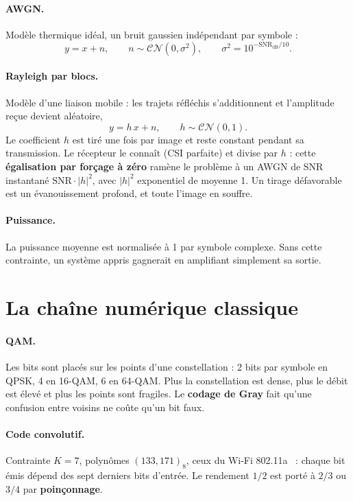 \paragraph{AWGN.} Modèle thermique idéal, un bruit gaussien indépendant par symbole :
\begin{equation}
  y = x + n, \qquad n \sim \mathcal{CN}(0,\sigma^2), \qquad \sigma^2 = 10^{-\mathrm{SNR_{dB}}/10} .
  \label{eq:awgn}
\end{equation}

\paragraph{Rayleigh par blocs.} Modèle d'une liaison mobile : les trajets réfléchis s'additionnent et
l'amplitude reçue devient aléatoire,
\begin{equation}
  y = h\,x + n, \qquad h \sim \mathcal{CN}(0,1) .
  \label{eq:rayleigh}
\end{equation}
Le coefficient $h$ est tiré une fois par image et reste constant pendant sa transmission. Le récepteur le
connaît (CSI parfaite) et divise par $h$ : cette \textbf{égalisation par forçage à zéro} ramène le problème à
un AWGN de SNR instantané $\mathrm{SNR}\cdot|h|^2$, avec $|h|^2$ exponentiel de moyenne 1. Un tirage
défavorable est un évanouissement profond, et toute l'image en souffre.

\paragraph{Puissance.} La puissance moyenne est normalisée à 1 par symbole complexe. Sans cette contrainte, un
système appris gagnerait en amplifiant simplement sa sortie.

\section{La chaîne numérique classique}
\label{sec:chaine_classique}

\paragraph{QAM.} Les bits sont placés sur les points d'une constellation : 2 bits par symbole en QPSK, 4 en
16-QAM, 6 en 64-QAM. Plus la constellation est dense, plus le débit est élevé et plus les points sont
fragiles. Le \textbf{codage de Gray} fait qu'une confusion entre voisins ne coûte qu'un bit faux.

\paragraph{Code convolutif.} Contrainte $K=7$, polynômes $(133,171)_8$, ceux du Wi-Fi
802.11a~\cite{ieee80211a} : chaque bit émis dépend des sept derniers bits d'entrée. Le rendement $1/2$ est
porté à $2/3$ ou $3/4$ par \textbf{poinçonnage}.

